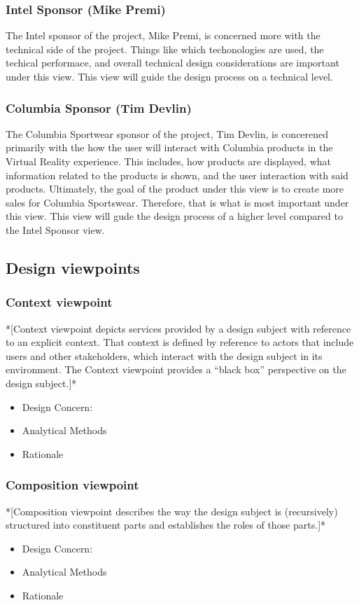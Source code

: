 \documentclass[10pt,journal,compsoc,onecolumn, draftclsnofoot]{IEEEtran}
\begin{document}
\subsubsection{Intel Sponsor (Mike Premi)}
The Intel sponsor of the project, Mike Premi, is concerned more with the technical side of the project.
Things like which techonologies are used, the techical performace, and overall technical design considerations are important under this view.
This view will guide the design process on a technical level.

\subsubsection{Columbia Sponsor (Tim Devlin)}
The Columbia Sportwear sponsor of the project, Tim Devlin, is concerened primarily with the how the user will interact with Columbia products in the Virtual Reality experience.
This includes, how products are displayed, what information related to the products is shown, and the user interaction with said products.
Ultimately, the goal of the product under this view is to create more sales for Columbia Sportswear.
Therefore, that is what is most important under this view.
This view will gude the design process of a higher level compared to the Intel Sponsor view.

\subsection{Design viewpoints}
\subsubsection{Context viewpoint}
*[Context viewpoint depicts services provided by a design subject with reference to an explicit context. That context is defined by reference to actors that include users and other stakeholders, which interact with the design subject in its environment. The Context viewpoint provides a “black box” perspective on the design subject.]*
\begin{itemize}
  \item Design Concern:
  \item Analytical Methods
  \item Rationale
\end{itemize}

\subsubsection{Composition viewpoint}
*[Composition viewpoint describes the way the design subject is (recursively) structured into constituent parts and establishes the roles of those parts.]*
\begin{itemize}
  \item Design Concern:
  \item Analytical Methods
  \item Rationale
\end{itemize}
\end{document}
